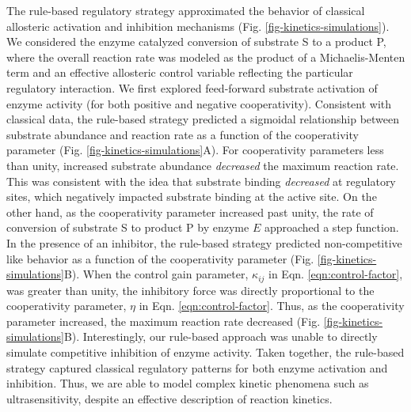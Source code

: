 \documentclass[12pt]{article}
\begin{document}
The rule-based regulatory strategy approximated the behavior of classical allosteric activation and inhibition mechanisms (Fig. \ref{fig-kinetics-simulations}). 
We considered the enzyme catalyzed conversion of substrate S to a product P, where the overall reaction rate was modeled as the product of a Michaelis-Menten term and an effective allosteric control variable reflecting the particular regulatory interaction. 
We first explored feed-forward substrate activation of enzyme activity (for both positive and negative cooperativity). 
Consistent with classical data, the rule-based strategy predicted a sigmoidal relationship between substrate abundance and reaction rate as a function of the cooperativity parameter (Fig. \ref{fig-kinetics-simulations}A). 
For cooperativity parameters less than unity, increased substrate abundance \textit{decreased} the maximum reaction rate. 
This was consistent with the idea that substrate binding \textit{decreased} at regulatory sites, which negatively impacted substrate binding at the active site. 
On the other hand, as the cooperativity parameter increased past unity, the rate of conversion of substrate S to product P by enzyme $E$ approached a step function. 
In the presence of an inhibitor, the rule-based strategy predicted non-competitive like behavior as a function of the cooperativity parameter (Fig. \ref{fig-kinetics-simulations}B). 
When the control gain parameter, $\kappa_{ij}$ in Eqn. \eqref{eqn:control-factor}, was greater than unity, the inhibitory force was directly proportional to the cooperativity parameter, $\eta$ in Eqn. \eqref{eqn:control-factor}. 
Thus, as the cooperativity parameter increased, the maximum reaction rate decreased (Fig. \ref{fig-kinetics-simulations}B). 
Interestingly, our rule-based approach was unable to directly simulate competitive inhibition of enzyme activity. 
Taken together, the rule-based strategy captured classical regulatory patterns for both enzyme activation and inhibition. 
Thus, we are able to model complex kinetic phenomena such as ultrasensitivity, despite an effective description of reaction kinetics. 
    
\end{document}
